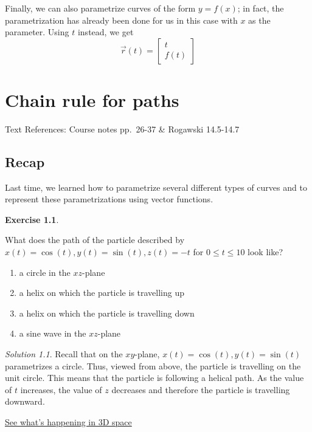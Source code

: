 \documentclass[
]{book}
\providecommand{\tightlist}{%
  \setlength{\itemsep}{0pt}\setlength{\parskip}{0pt}}
\theoremstyle{definition}
\theoremstyle{definition}
\theoremstyle{definition}
\newtheorem{exercise}{Exercise}[chapter]
\theoremstyle{definition}
\theoremstyle{remark}
\newtheorem*{solution}{Solution}
\begin{document}
Finally, we can also parametrize curves of the form \(y=f(x)\); in fact, the parametrization has already been done for us in this case with \(x\) as the parameter. Using \(t\) instead, we get \[\vec{r}(t)=\begin{bmatrix}t \\f(t)\end{bmatrix}\]

\hypertarget{lec-6}{%
\chapter{Chain rule for paths}\label{lec-6}}

Text References: Course notes pp.~26-37 \& Rogawski 14.5-14.7

\hypertarget{recap-4}{%
\section{Recap}\label{recap-4}}

Last time, we learned how to parametrize several different types of curves and to represent these parametrizations using vector functions.

\begin{exercise}
\protect\hypertarget{exr:unlabeled-div-40}{}\label{exr:unlabeled-div-40}

What does the path of the particle described by \(x(t)=\cos(t), y(t)=\sin(t), z(t)=-t\) for \(0\leq t \leq 10\) look like?

\begin{enumerate}
\def\labelenumi{\alph{enumi}.}
\tightlist
\item
  a circle in the \(xz\)-plane
\item
  a helix on which the particle is travelling up
\item
  a helix on which the particle is travelling down
\item
  a sine wave in the \(xz\)-plane
\end{enumerate}

\end{exercise}

\begin{solution}

Recall that on the \(xy\)-plane, \(x(t)=\cos(t), y(t)=\sin(t)\) parametrizes a circle. Thus, viewed from above, the particle is travelling on the unit circle. This means that the particle is following a helical path. As the value of \(t\) increases, the value of \(z\) decreases and therefore the particle is travelling downward.

\href{https://www.geogebra.org/m/n7axse42}{See what's happening in 3D space}

\end{solution}
\end{document}

